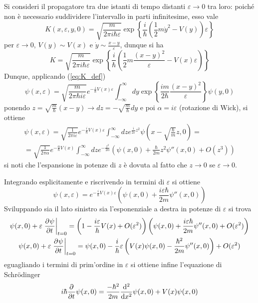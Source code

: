 Si consideri il propagatore tra due istanti di tempo distanti $\varepsilon\to0$ tra loro: poiché non è
necessario suddividere l'intervallo in parti infinitesime, esso vale
$$K(x,\varepsilon,y,0) = \sqrt{\frac{m}{2\pi i\hbar\varepsilon}}\exp\left\{\frac{i}{\hbar}\left(\frac{1}{2}m\dot
y^2-V(y)\right)\varepsilon\right\}$$
per $\varepsilon\to0$, $V(y)\sim V(x)$ e $\dot y\sim \frac{x-y}{\varepsilon}$, dunque si ha
$$K = \sqrt{\frac{m}{2\pi i\hbar\varepsilon}}\exp\left\{\frac{i}{\hbar}\left(\frac{1}{2}m\frac{(x-y)^2}
{\varepsilon}-V(x)\varepsilon\right)\right\}$$
Dunque, applicando (\ref{eq:K_def})
$$\psi(x,\varepsilon) = \sqrt{\frac{m}{2\pi\hbar i\varepsilon}}e^{-\frac{i}{\hbar}V(x)\varepsilon}
\int_{-\infty}^{\infty}dy \exp\left\{\frac{im}{2\hbar}\frac{(x-y)^2}{\varepsilon}\right\}\psi(y,0)
$$
ponendo $z=\sqrt{\frac{m}{\hbar}}(x-y)\to dz=-\sqrt{\frac{m}{\hbar}}dy$ e poi $\alpha = i\varepsilon$
(rotazione di Wick), si ottiene
\begin{gather*}
\psi(x,\varepsilon) = \sqrt{\frac{1}{2\pi i\varepsilon}}e^{-\frac{i}{\hbar}V(x)\varepsilon}
\int_{-\infty}^{\infty}dz e^{\frac{i}{2\varepsilon}z^2}\psi\left(x-\sqrt{\frac{\hbar}{m}}z,0\right)=\\
= \sqrt{\frac{1}{2\pi\alpha}}e^{-\frac{\alpha}{\hbar}V(x)}\int_{-\infty}^{\infty}dze^{-\frac{z^2}
{2\alpha}}\left(\psi(x,0)+\frac{\hbar}{2m}z^2\psi''(x,0)+O(z^3)\right)
\end{gather*}
si noti che l'espansione in potenze di $z$ è dovuta al fatto che $z\to0$ se $\varepsilon\to0$.

Integrando esplicitamente e riscrivendo in termini di $\varepsilon$ si ottiene
$$\psi(x,\varepsilon) = e^{-\frac{i}{\hbar}V(x)\varepsilon}\left(\psi(x,0)+\frac{i\varepsilon\hbar}{2m}
\psi''(x,0)\right)$$
Sviluppando sia il lato sinistro sia l'esponenziale a destra in potenze di $\varepsilon$ si trova
\begin{gather*}
\psi(x,0)+\varepsilon\eval{\pdv[]{\psi}{t}}_{t=0} = \left(1-\frac{i\varepsilon}{\hbar}V(x)+O(\varepsilon^2)
\right)\left(\psi(x,0)+\frac{i\varepsilon\hbar}{2m}\psi''(x,0)+O(\varepsilon^2)\right)\\
\psi(x,0)+\varepsilon\eval{\pdv[]{\psi}{t}}_{t=0}=\psi(x,0)-\frac{i}{\hbar}\varepsilon
\left(V(x)\psi(x,0)-\frac{\hbar^2}{2m}\psi''(x,0)\right)+O(\varepsilon^2)
\end{gather*}
eguagliando i termini di prim'ordine in $\varepsilon$ si ottiene infine l'equazione di Schrödinger
$$i\hbar\pdv[]{}{t}\psi(x,0)=\frac{-\hbar^2}{2m}\dv[2]{}{x}\psi(x,0)+V(x)\psi(x,0)$$
